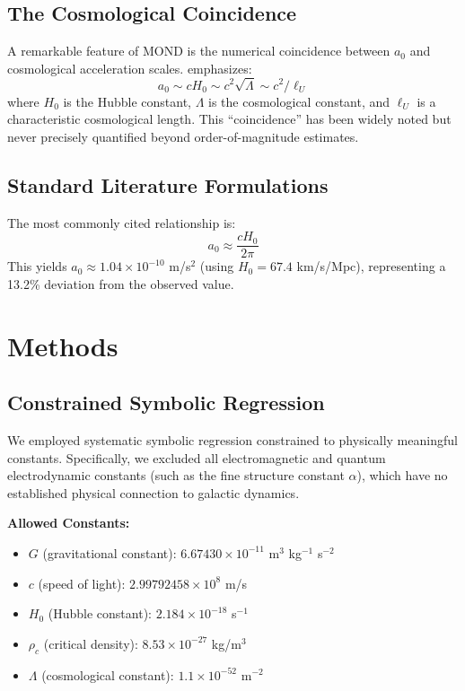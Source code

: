 \documentclass[12pt,preprint]{aastex631}
\begin{document}
\subsection{The Cosmological Coincidence}

A remarkable feature of MOND is the numerical coincidence between $a_0$ and cosmological acceleration scales. \citet{Milgrom2020} emphasizes:
\begin{equation}
a_0 \sim cH_0 \sim c^2\sqrt{\Lambda} \sim c^2/\ell_U
\end{equation}
where $H_0$ is the Hubble constant, $\Lambda$ is the cosmological constant, and $\ell_U$ is a characteristic cosmological length. This ``coincidence'' has been widely noted but never precisely quantified beyond order-of-magnitude estimates.

\subsection{Standard Literature Formulations}

The most commonly cited relationship is:
\begin{equation}
a_0 \approx \frac{cH_0}{2\pi}
\end{equation}
This yields $a_0 \approx 1.04 \times 10^{-10}$ m/s$^2$ (using $H_0 = 67.4$ km/s/Mpc), representing a 13.2\% deviation from the observed value.

\section{Methods}
\label{sec:methods}

\subsection{Constrained Symbolic Regression}

We employed systematic symbolic regression constrained to physically meaningful constants. Specifically, we excluded all electromagnetic and quantum electrodynamic constants (such as the fine structure constant $\alpha$), which have no established physical connection to galactic dynamics.

\textbf{Allowed Constants:}
\begin{itemize}
    \item $G$ (gravitational constant): $6.67430 \times 10^{-11}$ m$^3$ kg$^{-1}$ s$^{-2}$
    \item $c$ (speed of light): $2.99792458 \times 10^8$ m/s
    \item $H_0$ (Hubble constant): $2.184 \times 10^{-18}$ s$^{-1}$
    \item $\rho_c$ (critical density): $8.53 \times 10^{-27}$ kg/m$^3$
    \item $\Lambda$ (cosmological constant): $1.1 \times 10^{-52}$ m$^{-2}$
\end{itemize}
\end{document}
